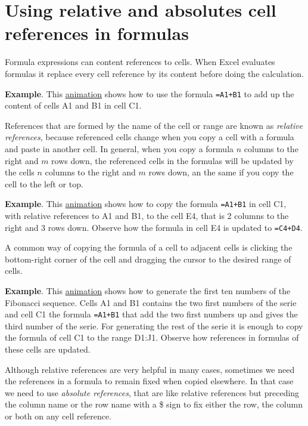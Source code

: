 \section{Using relative and absolutes cell references in formulas}\hypertarget{using-relative-and-absolutes-cell-references-in-formulas}{}\label{using-relative-and-absolutes-cell-references-in-formulas}

Formula expressions can content references to cells. When Excel evaluates formulas it replace every cell reference by its content before doing the calculation.

\textbf{Example}. This
\href{http://aprendeconalf.es/office/excel/manual/img/example_formulas_with_references.gif}{animation} shows how to use
the formula \texttt{=A1+B1} to add up the content of cells A1 and B1 in cell C1.

References that are formed by the name of the cell or range are known as \emph{relative references}, because referenced
cells change when you copy a cell with a formula and paste in another cell. In general, when you copy a formula $n$
columns to the right and $m$ rows down, the referenced cells in the formulas will be updated by the cells $n$ columns to
the right and $m$ rows down, an the same if you copy the cell to the left or top.

\textbf{Example}. This \href{http://aprendeconalf.es/office/excel/manual/img/example_copying_formulas_with_relative_references.gif}{animation} shows how to copy the formula \texttt{=A1+B1} in cell C1, with relative references to A1 and B1, to the cell E4, that is 2 columns to the right and 3 rows down. Observe how the formula in cell E4 is updated to \texttt{=C4+D4}.

A common way of copying the formula of a cell to adjacent cells is clicking the bottom-right corner of the cell and
dragging the cursor to the desired range of cells.

\textbf{Example}. This \href{http://aprendeconalf.es/office/excel/manual/img/example_fibonacci_serie.gif}{animation}
shows how to generate the first ten numbers of the Fibonacci sequence. Cells A1 and B1 contains the two first numbers of
the serie and cell C1 the formula \texttt{=A1+B1} that add the two first numbers up and gives the third number of the
serie. For generating the rest of the serie it is enough to copy the formula of cell C1 to the range D1:J1. Observe how
references in formulas of these cells are updated.

Although relative references are very helpful in many cases, sometimes we need the references in a formula to remain
fixed when copied elsewhere.
In that case we need to use \emph{absolute references}, that are like relative references but preceding the column name
or the row name with a \$ sign to fix either the row, the column or both on any cell reference.

